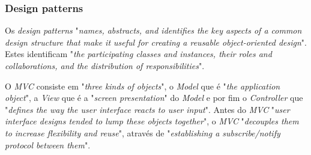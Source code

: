  \subsubsection{Design patterns}
Os \textit{design patterns} "\emph{names, abstracts, and identifies the key aspects of a common design structure that make it useful for creating a reusable object-oriented design}"\citep{dart}. Estes identificam "\emph{the participating classes and instances, their roles and collaborations, and the distribution of responsibilities}"\citep{dart}.

O \textit{MVC} consiste em "\emph{three kinds of objects}"\citep{dart}, o \textit{Model} que é "\emph{the application object}"\citep{dart}, a \textit{View} que é a "\emph{screen presentation}"\citep{dart} do \textit{Model} e por fim o \textit{Controller} que "\emph{defines the way the user interface reacts to user input}"\citep{dart}. Antes do \textit{MVC} "\emph{user interface designs tended to lump these objects together}"\citep{dart}, o \textit{MVC} "\emph{decouples them to increase flexibility and reuse}"\citep{dart}, através de "\emph{establishing a subscribe/notify protocol between them}"\citep{dart}.
